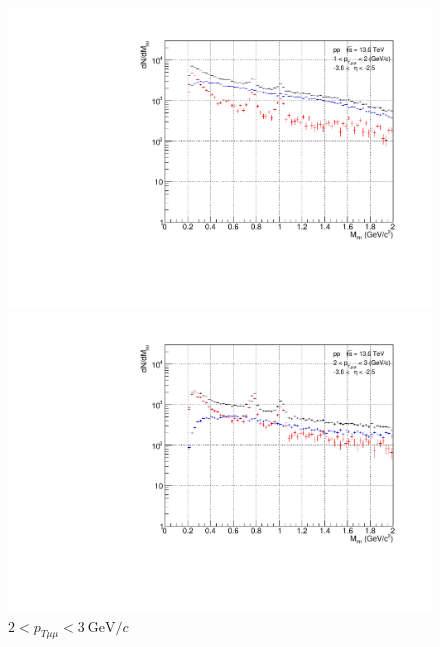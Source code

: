                 \begin{figure}[H]
                    \centering
                    \begin{minipage}{0.45\textwidth}
                        \centering
                        \includegraphics[width=\textwidth]{fig/3_4_1_CB_pt_1to2.pdf}
                        \caption*{$1 < p_{T\mu\mu} < 2\ \mathrm{GeV}/c$}
                    \end{minipage}
                    \hfill
                    \begin{minipage}{0.45\textwidth}
                        \centering
                        \includegraphics[width=\textwidth]{fig/3_4_1_CB_pt_2to3.pdf}
                        \caption*{$2 < p_{T\mu\mu} < 3\ \mathrm{GeV}/c$}
                    \end{minipage}

\end{figure}

